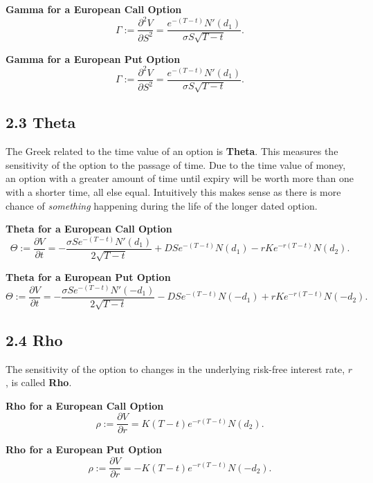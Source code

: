 \documentclass[11pt]{article}
\begin{document}
\textbf{Gamma for a European Call Option}
\begin{equation}
    \Gamma := \frac{\partial^2 V}{\partial S^2} = \frac{e^{-(T-t)} N'(d_1)}{\sigma S \sqrt{T-t}}.
\end{equation}

\textbf{Gamma for a European Put Option}
\begin{equation}
    \Gamma := \frac{\partial^2 V}{\partial S^2} = \frac{e^{-(T-t)} N'(d_1)}{\sigma S \sqrt{T-t}}.
\end{equation}

\subsection*{2.3 Theta}
The Greek related to the time value of an option is \textbf{Theta}. This measures the sensitivity of the option to the passage of time. Due to the time value of money, an option with a greater amount of time until expiry will be worth more than one with a shorter time, all else equal. Intuitively this makes sense as there is more chance of \textit{something} happening during the life of the longer dated option. 

\textbf{Theta for a European Call Option}
\begin{equation}
    \Theta := \frac{\partial V}{\partial t} = -\frac{\sigma S e^{-(T-t)} N'(d_1)}{2 \sqrt{T-t}} + DSe^{-(T-t)} N(d_1) - rKe^{-r(T-t)} N(d_2).
\end{equation}

\textbf{Theta for a European Put Option}
\begin{equation}
    \Theta := \frac{\partial V}{\partial t} = -\frac{\sigma S e^{-(T-t)} N'(-d_1)}{2 \sqrt{T-t}} - DSe^{-(T-t)} N(-d_1) + rKe^{-r(T-t)} N(-d_2).
\end{equation}

\subsection*{2.4 Rho}
The sensitivity of the option to changes in the underlying risk-free interest rate, $r$, is called \textbf{Rho}.

\textbf{Rho for a European Call Option}
\begin{equation}
    \rho := \frac{\partial V}{\partial r} = K(T-t)e^{-r(T-t)} N(d_2).
\end{equation}

\textbf{Rho for a European Put Option}
\begin{equation}
    \rho := \frac{\partial V}{\partial r} = -K(T-t)e^{-r(T-t)} N(-d_2).
\end{equation}
\end{document}
